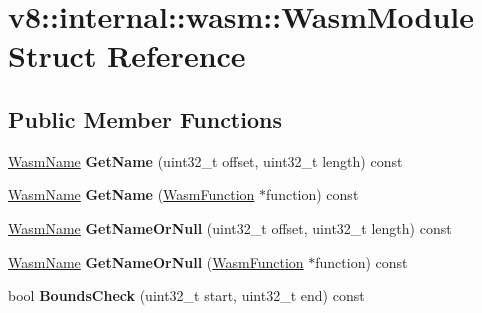 \hypertarget{structv8_1_1internal_1_1wasm_1_1_wasm_module}{}\section{v8\+:\+:internal\+:\+:wasm\+:\+:Wasm\+Module Struct Reference}
\label{structv8_1_1internal_1_1wasm_1_1_wasm_module}
\subsection*{Public Member Functions}
\begin{DoxyCompactItemize}
\item 
\hyperlink{classv8_1_1internal_1_1_vector}{Wasm\+Name} {\bfseries Get\+Name} (uint32\+\_\+t offset, uint32\+\_\+t length) const \hypertarget{structv8_1_1internal_1_1wasm_1_1_wasm_module_ab88b34a3ebb21a6109f0e6d849f0d9d8}{}\label{structv8_1_1internal_1_1wasm_1_1_wasm_module_ab88b34a3ebb21a6109f0e6d849f0d9d8}

\item 
\hyperlink{classv8_1_1internal_1_1_vector}{Wasm\+Name} {\bfseries Get\+Name} (\hyperlink{structv8_1_1internal_1_1wasm_1_1_wasm_function}{Wasm\+Function} $\ast$function) const \hypertarget{structv8_1_1internal_1_1wasm_1_1_wasm_module_ab1f9c6f8b68c2fc9c845fcff40649d8f}{}\label{structv8_1_1internal_1_1wasm_1_1_wasm_module_ab1f9c6f8b68c2fc9c845fcff40649d8f}

\item 
\hyperlink{classv8_1_1internal_1_1_vector}{Wasm\+Name} {\bfseries Get\+Name\+Or\+Null} (uint32\+\_\+t offset, uint32\+\_\+t length) const \hypertarget{structv8_1_1internal_1_1wasm_1_1_wasm_module_ae14ada0a19b40b5af926b429dfbf1267}{}\label{structv8_1_1internal_1_1wasm_1_1_wasm_module_ae14ada0a19b40b5af926b429dfbf1267}

\item 
\hyperlink{classv8_1_1internal_1_1_vector}{Wasm\+Name} {\bfseries Get\+Name\+Or\+Null} (\hyperlink{structv8_1_1internal_1_1wasm_1_1_wasm_function}{Wasm\+Function} $\ast$function) const \hypertarget{structv8_1_1internal_1_1wasm_1_1_wasm_module_a96f1153419dac9892de60e58315a1874}{}\label{structv8_1_1internal_1_1wasm_1_1_wasm_module_a96f1153419dac9892de60e58315a1874}

\item 
bool {\bfseries Bounds\+Check} (uint32\+\_\+t start, uint32\+\_\+t end) const \hypertarget{structv8_1_1internal_1_1wasm_1_1_wasm_module_a849a24636a1825125fa278af7e7cf183}{}\label{structv8_1_1internal_1_1wasm_1_1_wasm_module_a849a24636a1825125fa278af7e7cf183}


\end{DoxyCompactItemize}
